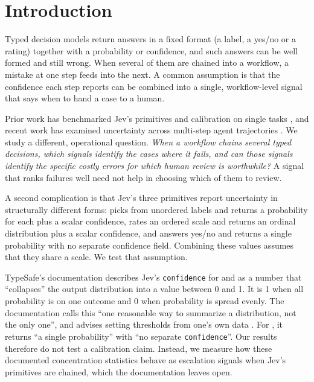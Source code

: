 \section{Introduction}

Typed decision models return answers in a fixed format (a label, a
yes/no or a rating) together with a probability or confidence, and such
answers can be well formed and still wrong. When several of them are
chained into a workflow, a mistake at one step feeds into the next. A common assumption is that the confidence each
step reports can be combined into a single, workflow-level signal that
says when to hand a case to a human.

Prior work has benchmarked Jev's primitives and calibration on single
tasks \citep{deusser2026jev,meng2026jevaudit,denney2026jev}, and recent
work has examined uncertainty across multi-step agent trajectories
\citep{lin2026uqagents}. We study a different, operational question.
\emph{When a workflow chains several typed decisions, which signals
identify the cases where it fails, and can those signals identify the
specific costly errors for which human review is worthwhile?} A signal
that ranks failures well need not help in choosing which of them to
review.

A second complication is that Jev's three primitives report uncertainty
in structurally different forms: \choice{} picks from unordered labels
and returns a probability for each plus a scalar confidence, \score{}
rates an ordered scale and returns an ordinal distribution plus a scalar
confidence, and \noul{} answers yes/no and returns a single probability
with no separate confidence field. Combining these values assumes that
they share a scale. We test that assumption.

TypeSafe's documentation describes Jev's \texttt{confidence} for
\choice{} and \score{} as a number that ``collapses'' the output
distribution into a value between 0 and 1. It is 1 when all probability
is on one outcome and 0 when probability is spread evenly. The
documentation calls this ``one reasonable way to summarize a
distribution, not the only one'', and advises setting thresholds from
one's own data \citep{typesafe2026confidence}. For \noul{}, it returns
``a single probability'' with ``no separate \texttt{confidence}''. Our
results therefore do not test a calibration claim. Instead, we measure
how these documented concentration statistics behave as escalation
signals when Jev's primitives are chained, which the documentation
leaves open.

